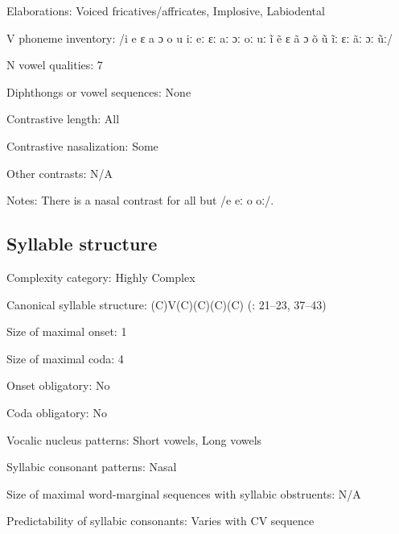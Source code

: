{\begin{appendixdesc}
\item[Elaborations:] Voiced fricatives/affricates, Implosive, Labiodental

\item[V phoneme inventory:] /i e ɛ a ɔ o u iː eː ɛː aː ɔː oː uː ĩ ẽ ɛ ã ɔ õ ũ ĩː ɛː ãː ɔː ũː/

\item[N vowel qualities:] 7

\item[Diphthongs or vowel sequences:] None

\item[Contrastive length:] All

\item[Contrastive nasalization:] Some

\item[Other contrasts:] N/A

\item[Notes:] There is a nasal contrast for all but /e eː o oː/.
\end{appendixdesc}
\subsection*{Syllable structure}
\begin{appendixdesc}

\item[Complexity category:] Highly Complex

\item[Canonical syllable structure:] (C)V(C)(C)(C)(C) (\citealt{WieringWiering1994}: 21--23, 37--43)

\item[Size of maximal onset:] 1

\item[Size of maximal coda:] 4

\item[Onset obligatory:] No

\item[Coda obligatory:] No

\item[Vocalic nucleus patterns:] Short vowels, Long vowels

\item[Syllabic consonant patterns:] Nasal

\item[Size of maximal word-marginal sequences with syllabic obstruents:] N/A

\item[Predictability of syllabic consonants:] Varies with CV sequence


\end{appendixdesc}}
